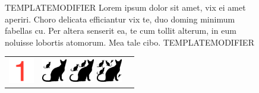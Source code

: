 \documentclass{article}
\begin{document}

\begin{figure}[b]
\begin{center}
\begin{minipage}[c]{60mm}
\begin{center}
TEMPLATEMODIFIER Lorem ipsum dolor sit amet, vix ei amet aperiri. Choro delicata efficiantur vix te, duo doming minimum fabellas cu. Per altera senserit ea, te cum tollit alterum, in eum noluisse lobortis atomorum. Mea tale cibo. TEMPLATEMODIFIER \\
\end{center}
\end{minipage}
\vspace{4mm}
\def\tabularxcolumn#1{m{#1}}
\begin{tabularx}{80mm}{ccc}
\includegraphics[width=11mm]{images/TEMPLATELEVEL}
&
\includegraphics[width=11mm]{images/TEMPLATEGAMEMODE1}
\includegraphics[width=11mm]{images/TEMPLATEGAMEMODE2}
\includegraphics[width=11mm]{images/TEMPLATEGAMEMODE3}
&
\end{tabularx}
\end{center}
\end{figure}
\end{document}
